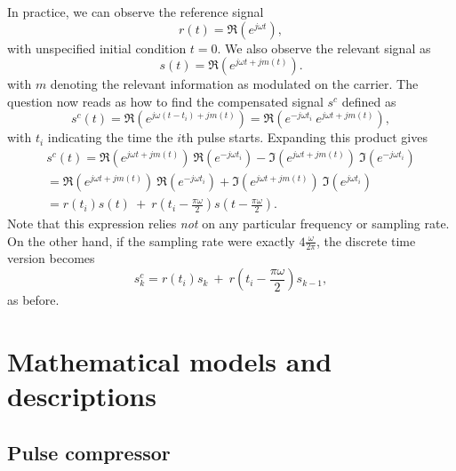 \documentclass[12pt]{amsart}
\begin{document}
In practice, we can observe the reference signal 
\begin{equation}
	r(t) = \Re\left( e^{j\omega t} \right),
	\label{eq.csignal.r}
\end{equation}
with unspecified initial condition $t=0$.
We also observe the relevant signal as 
\begin{equation}
	s(t) = \Re\left( e^{j\omega t + j m(t)}\right). 
	\label{eq.csignal.r}
\end{equation}
with $m$ denoting the relevant information as modulated on the carrier.
The question now reads as how to find the compensated signal $s^c$ defined as 
\begin{equation}
	s^c(t)  = \Re\left( e^{j\omega (t-t_i) + j m(t)}\right) = \Re\left( e^{-j\omega t_i} \ e^{j\omega t + j m(t)}\right), 
	\label{eq.csignal.sc}
\end{equation}
with $t_i$ indicating the time the $i$th pulse starts.
Expanding this product gives 
\begin{multline}
	s^c(t)  
	= \Re\left( e^{j\omega t + j m(t)}\right) \  \Re\left( e^{-j\omega t_i}\right) -  \Im\left( e^{j\omega t + j m(t)}\right)\ \Im\left( e^{-j\omega t_i}\right) \\
	= \Re\left( e^{j\omega t + j m(t)}\right) \  \Re\left( e^{-j\omega t_i}\right) +  \Im\left( e^{j\omega t + j m(t)}\right)\ \Im\left( e^{j\omega t_i}\right) \\
	= r(t_i) s(t) \  + \ {r}\left(t_i-\frac{\pi\omega}{2}\right) s\left( t-\frac{\pi\omega}{2}\right).
	\label{eq.csignal.sc2}
\end{multline}
Note that this expression relies {\em not} on any particular frequency or sampling rate.
On the other hand, if the sampling rate were exactly $4\frac{\omega}{2\pi}$, the discrete time version becomes 
\begin{equation}
	s^c_k
	= r(t_i) s_k \  + \ {r}\left(t_i-\frac{\pi\omega}{2}\right) s_{k-1},
	\label{eq.csignal.sc3}
\end{equation}
as before.


\newpage
{}
\section{Mathematical models and descriptions}

\subsection{Pulse compressor}
\end{document}
